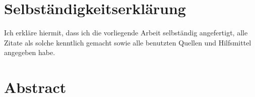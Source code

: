 \documentclass[a4paper,11pt]{report}
\begin{document}

\theoremstyle{change} %
\theoremheaderfont{\normalfont\scshape}
\theorembodyfont{\normalfont}
\theoremseparator{}
\newtheorem{Par}{}[chapter]
\newtheorem{The}[Par]{Theorem}
\newtheorem{Pro}[Par]{Proposition}
\newtheorem{Lem}[Par]{Lemma}
\newtheorem{Cor}[Par]{Corollary}
\newtheorem{Def}[Par]{Definition}
\newtheorem{Not}[Par]{Notation}
\newtheorem{Ex}[Par]{Example}
\newtheorem{Rem}[Par]{Remark}
\theoremstyle{nonumberplain}
\theoremheaderfont{\normalfont\itshape}
\theoremsymbol{$\square$}
\newtheorem{Bew}{Proof}


\begin{titlepage}

\end{titlepage}

\setcounter{page}{2}


\chapter*{Selbständigkeitserklärung}

Ich erkläre hiermit, dass ich die vorliegende Arbeit selbständig angefertigt, alle Zitate als solche kenntlich gemacht sowie alle benutzten Quellen und Hilfsmittel angegeben habe.


\chapter*{Abstract}





\tableofcontents

\end{document}
